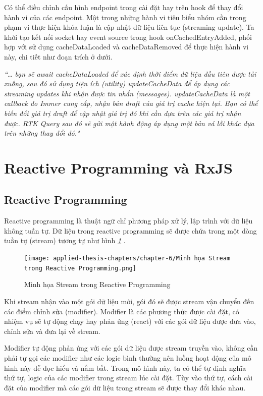 Có thể điều chỉnh cấu hình endpoint trong cài đặt hay trên hook để thay đổi hành vi của các endpoint.
Một trong những hành vi tiêu biểu nhóm cần trong phạm vi thực hiện khóa luận là cập nhật dữ liệu liên tục (streaming update).
Ta khởi tạo kết nối socket hay event source trong hook onCachedEntryAdded, phối hợp với sử dụng cacheDataLoaded và cacheDataRemoved để thực hiện hành vi này, chi tiết như đoạn trích ở dưới.
\par

\textit{“… bạn sẽ await cacheDataLoaded để xác định thời điểm dữ liệu đầu tiên được tải xuống, sau đó sử dụng tiện ích (utility) updateCacheData để áp dụng các streaming updates khi nhận được tin nhắn (messages).
      updateCacheData là một callback do Immer cung cấp, nhận bản draft của giá trị cache hiện tại.
      Bạn có thể biến đổi giá trị draft để cập nhật giá trị đó khi cần dựa trên các giá trị nhận được.
      RTK Query sau đó sẽ gửi một hành động áp dụng một bản vá lỗi khác dựa trên những thay đổi đó."} \cite{chap4bib3}

\newpage
\section{Reactive Programming và RxJS}

\subsection{Reactive Programming}

\tab Reactive programming là thuật ngữ chỉ phương pháp xử lý, lập trình với dữ liệu không tuần tự.
Dữ liệu trong reactive programming sẽ được chứa trong một dòng tuần tự (stream) tương tự như hình \textit{\ref{fig:StreamInRP} }.

\begin{figure}[H]
      \centering
      \texttt{[image: applied-thesis-chapters/chapter-6/Minh họa Stream trong Reactive Programming.png]}
      \caption{Minh họa Stream trong Reactive Programming \cite{chap4bib4}}
      \label{fig:StreamInRP}
\end{figure}

Khi stream nhận vào một gói dữ liệu mới, gói đó sẽ được stream vận chuyển đến các điểm chỉnh sửa (modifier).
Modifier là các phương thức được cài đặt, có nhiệm vụ sẽ tự động chạy hay phản ứng (react) với các gói dữ liệu được đưa vào, chỉnh sửa và đưa lại về stream.
\par

Modifier tự động phản ứng với các gói dữ liệu được stream truyền vào, không cần phải tự gọi các modifier như các logic bình thường nên luồng hoạt động của mô hình này dễ đọc hiểu và nắm bắt.
Trong mô hình này, ta có thể tự định nghĩa thứ tự, logic của các modifier trong stream lúc cài đặt.
Tùy vào thứ tự, cách cài đặt của modifier mà các gói dữ liệu trong stream sẽ được thay đổi khác nhau.

